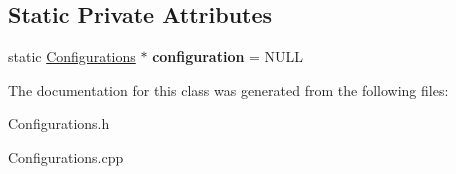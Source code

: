 \subsection*{\-Static \-Private \-Attributes}
\begin{DoxyCompactItemize}
\item 
\hypertarget{classConfigurations_af255cfca8f5d423848e8ff447036b193}{static \hyperlink{classConfigurations}{\-Configurations} $\ast$ {\bfseries configuration} = \-N\-U\-L\-L}\label{classConfigurations_af255cfca8f5d423848e8ff447036b193}

\end{DoxyCompactItemize}


\-The documentation for this class was generated from the following files\-:\begin{DoxyCompactItemize}
\item 
\-Configurations.\-h\item 
\-Configurations.\-cpp\end{DoxyCompactItemize}
